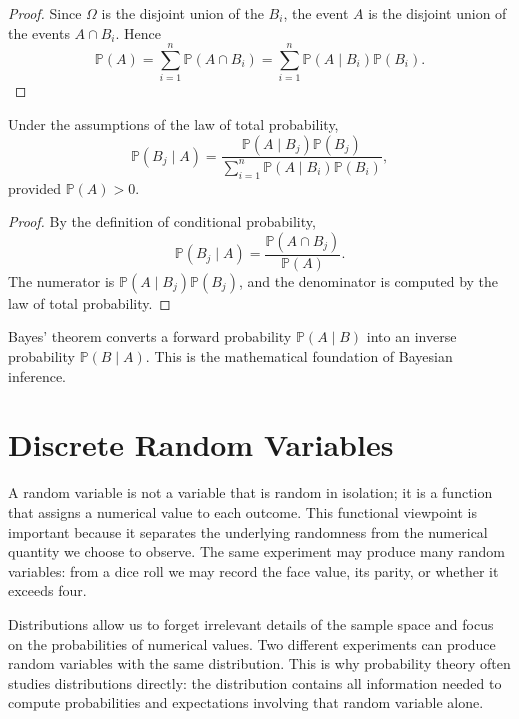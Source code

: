 \begin{proof}
Since $\Omega$ is the disjoint union of the $B_i$, the event $A$ is the disjoint union of the events $A\cap B_i$. Hence
\[
    \mathbb{P}(A)=\sum_{i=1}^{n}\mathbb{P}(A\cap B_i)
    =\sum_{i=1}^{n}\mathbb{P}(A\mid B_i)\mathbb{P}(B_i).
\]
\end{proof}

\begin{theorem}
Under the assumptions of the law of total probability,
\[
    \mathbb{P}(B_j\mid A)=
    \frac{\mathbb{P}(A\mid B_j)\mathbb{P}(B_j)}{\sum_{i=1}^{n}\mathbb{P}(A\mid B_i)\mathbb{P}(B_i)},
\]
provided $\mathbb{P}(A)>0$.
\end{theorem}

\begin{proof}
By the definition of conditional probability,
\[
    \mathbb{P}(B_j\mid A)=\frac{\mathbb{P}(A\cap B_j)}{\mathbb{P}(A)}.
\]
The numerator is $\mathbb{P}(A\mid B_j)\mathbb{P}(B_j)$, and the denominator is computed by the law of total probability.
\end{proof}

\begin{remark}
Bayes' theorem converts a forward probability $\mathbb{P}(A\mid B)$ into an inverse probability $\mathbb{P}(B\mid A)$. This is the mathematical foundation of Bayesian inference.
\end{remark}

\section{Discrete Random Variables}


A random variable is not a variable that is random in isolation; it is a function that assigns a numerical value to each outcome. This functional viewpoint is important because it separates the underlying randomness from the numerical quantity we choose to observe. The same experiment may produce many random variables: from a dice roll we may record the face value, its parity, or whether it exceeds four.

Distributions allow us to forget irrelevant details of the sample space and focus on the probabilities of numerical values. Two different experiments can produce random variables with the same distribution. This is why probability theory often studies distributions directly: the distribution contains all information needed to compute probabilities and expectations involving that random variable alone.


